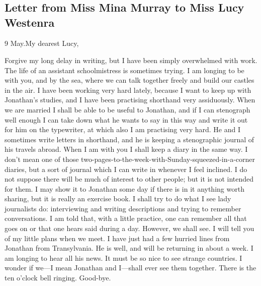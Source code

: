 \chapter[Chapter \thechapter]{}

\section{Letter from Miss Mina Murray to Miss Lucy Westenra}
	
	
\begin{mail}{9 May.}{My dearest Lucy,}

Forgive my long delay in writing, but I have been simply overwhelmed with work. The life of an assistant schoolmistress is sometimes trying. I am longing to be with you, and by the sea, where we can talk together freely and build our castles in the air. I have been working very hard lately, because I want to keep up with Jonathan's studies, and I have been practising shorthand very assiduously. When we are married I shall be able to be useful to Jonathan, and if I can stenograph well enough I can take down what he wants to say in this way and write it out for him on the typewriter, at which also I am practising very hard. He and I sometimes write letters in shorthand, and he is keeping a stenographic journal of his travels abroad. When I am with you I shall keep a diary in the same way. I don't mean one of those two-pages-to-the-week-with-Sunday-squeezed-in-a-corner diaries, but a sort of journal which I can write in whenever I feel inclined. I do not suppose there will be much of interest to other people; but it is not intended for them. I may show it to Jonathan some day if there is in it anything worth sharing, but it is really an exercise book. I shall try to do what I see lady journalists do: interviewing and writing descriptions and trying to remember conversations. I am told that, with a little practice, one can remember all that goes on or that one hears said during a day. However, we shall see. I will tell you of my little plans when we meet. I have just had a few hurried lines from Jonathan from Transylvania. He is well, and will be returning in about a week. I am longing to hear all his news. It must be so nice to see strange countries. I wonder if we—I mean Jonathan and I—shall ever see them together. There is the ten o'clock bell ringing. Good-bye.



\end{mail}
	


